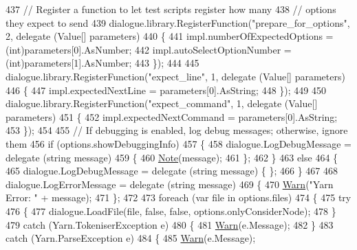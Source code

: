 \begin{DoxyCode}
437             \textcolor{comment}{// Register a function to let test scripts register how many}
438             \textcolor{comment}{// options they expect to send}
439             dialogue.library.RegisterFunction(\textcolor{stringliteral}{"prepare\_for\_options"}, 2, delegate (Value[] parameters)
440             \{
441                 impl.numberOfExpectedOptions = (int)parameters[0].AsNumber;
442                 impl.autoSelectOptionNumber = (int)parameters[1].AsNumber;
443             \});
444 
445             dialogue.library.RegisterFunction(\textcolor{stringliteral}{"expect\_line"}, 1, delegate (Value[] parameters)
446             \{
447                 impl.expectedNextLine = parameters[0].AsString;
448             \});
449 
450             dialogue.library.RegisterFunction(\textcolor{stringliteral}{"expect\_command"}, 1, delegate (Value[] parameters)
451             \{
452                 impl.expectedNextCommand = parameters[0].AsString;
453             \});
454 
455             \textcolor{comment}{// If debugging is enabled, log debug messages; otherwise, ignore them}
456             \textcolor{keywordflow}{if} (options.showDebuggingInfo)
457             \{
458                 dialogue.LogDebugMessage = delegate (\textcolor{keywordtype}{string} message)
459                 \{
460                     \hyperlink{a00195_a939cc9e943c574b36c6af93e9c772702}{Note}(message);
461                 \};
462             \}
463             \textcolor{keywordflow}{else}
464             \{
465                 dialogue.LogDebugMessage = delegate (\textcolor{keywordtype}{string} message) \{ \};
466             \}
467 
468             dialogue.LogErrorMessage = delegate (\textcolor{keywordtype}{string} message)
469             \{
470                 \hyperlink{a00195_a979bb6f049b6c5294f745a19e24ddd9d}{Warn}(\textcolor{stringliteral}{"Yarn Error: "} + message);
471             \};
472 
473             \textcolor{keywordflow}{foreach} (var file \textcolor{keywordflow}{in} options.files)
474             \{
475                 \textcolor{keywordflow}{try}
476                 \{
477                     dialogue.LoadFile(file, \textcolor{keyword}{false}, \textcolor{keyword}{false}, options.onlyConsiderNode);
478                 \}
479                 \textcolor{keywordflow}{catch} (Yarn.TokeniserException e)
480                 \{
481                     \hyperlink{a00195_a979bb6f049b6c5294f745a19e24ddd9d}{Warn}(e.Message);
482                 \}
483                 \textcolor{keywordflow}{catch} (Yarn.ParseException e)
484                 \{
485                     \hyperlink{a00195_a979bb6f049b6c5294f745a19e24ddd9d}{Warn}(e.Message);

\end{DoxyCode}
